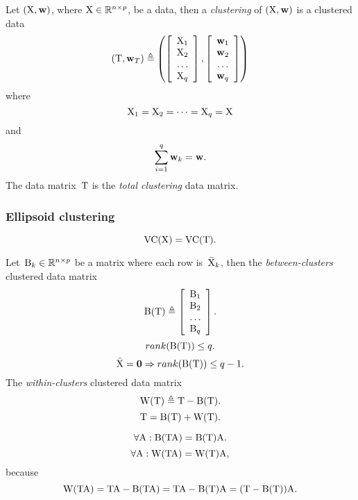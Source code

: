 \documentclass[10pt,a4paper]{article}
\theoremstyle{plain} \newtheorem{Lem}{Lemma}
\begin{document}
\bigskip
Let $(\mathrm X, \mathbf w)$, where $\mathrm X \in \mathbb R^{n \times p}$, be a data, then a {\em clustering} of $(\mathrm X, \mathbf w)$ is a clustered data
$$ (\mathrm T, \mathbf w_T) \triangleq
   \left (
     \left[
       \begin{array}{c}
         \mathrm X_1 \\
         \mathrm X_2 \\
         \dots \\
         \mathrm X_q
       \end{array}
     \right],
     \left[
       \begin{array}{c}
          \mathbf w_1 \\
          \mathbf w_2 \\
          \dots \\
          \mathbf w_q
       \end{array}
     \right]
   \right)
$$
where
$$ \mathrm X_1 = \mathrm X_2 = \dots = \mathrm X_q = \mathrm X $$
and
$$ \sum_{i=1}^q \mathbf w_k = \mathbf w. $$
The data matrix~$\mathrm T$ is the {\em total clustering} data matrix.


\subsubsection{Ellipsoid clustering}

\bigskip
$$ \mathrm {VC}(\mathrm X) = \mathrm {VC} (\mathrm T). $$

\bigskip
Let~$\mathrm B_k \in \mathbb R^{n \times p}$ be a matrix where each row is~$\bar {\mathrm X}_k$,
then the {\em between-clusters} clustered data matrix
$$ \mathrm B(\mathrm T) \triangleq
     \left[
       \begin{array}{c}
         \mathrm B_1 \\
         \mathrm B_2 \\
         \dots \\
         \mathrm B_q
       \end{array}
     \right].
$$
$$ rank(\mathrm B(\mathrm T)) \le q. $$
$$ \bar {\mathrm X} = \mathbf 0 \Rightarrow rank(\mathrm B(\mathrm T)) \le q - 1. $$
The {\em within-clusters} clustered data matrix
$$ \mathrm W(\mathrm T) \triangleq \mathrm T - \mathrm B(\mathrm T). $$
$$ \mathrm T = \mathrm B(\mathrm T) + \mathrm W(\mathrm T). $$

\bigskip
$$ \forall \mathrm A : \mathrm B(\mathrm T \mathrm A) = \mathrm B(\mathrm T) \mathrm A. $$
$$ \forall \mathrm A : \mathrm W(\mathrm T \mathrm A) = \mathrm W(\mathrm T) \mathrm A, $$
because
$$ \mathrm W(\mathrm T \mathrm A) = \mathrm T \mathrm A - \mathrm B(\mathrm T \mathrm A) = \mathrm T \mathrm A - \mathrm B(\mathrm T) \mathrm A = (\mathrm T - \mathrm B(\mathrm T)) \mathrm A. $$
\end{document}
